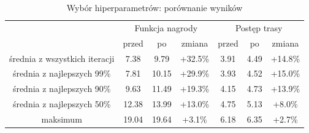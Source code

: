 \begin{table}[H]
    \centering
    \begin{tabular}{|c|c|c|c|c|c|c|}
        \hline
        & \multicolumn{3}{c|}{Funkcja nagrody} & \multicolumn{3}{c|}{Postęp trasy}\\
        & przed & po & zmiana & przed & po & zmiana \\
        \hline
        \hline
        średnia z wszystkich iteracji &  7.38 &  9.79 & +32.5\% & 3.91 & 4.49 & +14.8\% \\
        średnia z najlepszych 99\%    &  7.81 & 10.15 & +29.9\% & 3.93 & 4.52 & +15.0\% \\
        średnia z najlepszych 90\%    &  9.63 & 11.49 & +19.3\% & 4.15 & 4.73 & +13.9\% \\
        średnia z najlepszych 50\%    & 12.38 & 13.99 & +13.0\% & 4.75 & 5.13 &  +8.0\% \\
        maksimum                      & 19.04 & 19.64 &  +3.1\% & 6.18 & 6.35 &  +2.7\% \\
        \hline
    \end{tabular}
    \caption{Wybór hiperparametrów: porównanie wyników}
    \label{table}
\end{table}

\clearpage
